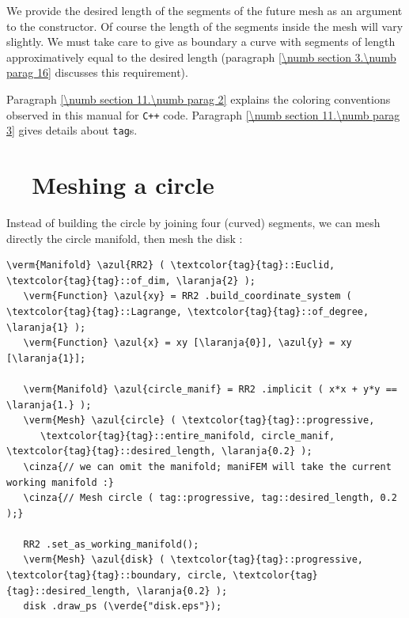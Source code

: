 We provide the desired length of the segments of the future mesh as an argument to the
constructor.
Of course the length of the segments inside the mesh will vary slightly.
We must take care to give as boundary a curve with segments of length approximatively equal
to the desired length (paragraph \ref{\numb section 3.\numb parag 16} discusses
this requirement).

Paragraph \ref{\numb section 11.\numb parag 2} explains the coloring conventions observed
in this manual for {\tt C++} code.
Paragraph \ref{\numb section 11.\numb parag 3} gives details about {\small\tt \textcolor{tag}{tag}}s.


\section{~~Meshing a circle}\label{\numb section 3.\numb parag 2}

Instead of building the circle by joining four (curved) segments, we can mesh directly
the circle manifold, then mesh the disk :

\begin{Verbatim}[commandchars=\\\{\},formatcom=\small\tt,frame=single,
   label=parag-\ref{\numb section 3.\numb parag 2}.cpp,rulecolor=\color{coment},
   baselinestretch=0.94,framesep=2mm                                            ]
   \verm{Manifold} \azul{RR2} ( \textcolor{tag}{tag}::Euclid, \textcolor{tag}{tag}::of_dim, \laranja{2} );
   \verm{Function} \azul{xy} = RR2 .build_coordinate_system ( \textcolor{tag}{tag}::Lagrange, \textcolor{tag}{tag}::of_degree, \laranja{1} );
   \verm{Function} \azul{x} = xy [\laranja{0}], \azul{y} = xy [\laranja{1}];
   
   \verm{Manifold} \azul{circle_manif} = RR2 .implicit ( x*x + y*y == \laranja{1.} );
   \verm{Mesh} \azul{circle} ( \textcolor{tag}{tag}::progressive,
      \textcolor{tag}{tag}::entire_manifold, circle_manif, \textcolor{tag}{tag}::desired_length, \laranja{0.2} );
   \cinza{// we can omit the manifold; maniFEM will take the current working manifold :}
   \cinza{// Mesh circle ( tag::progressive, tag::desired_length, 0.2 );}
   
   RR2 .set_as_working_manifold();
   \verm{Mesh} \azul{disk} ( \textcolor{tag}{tag}::progressive, \textcolor{tag}{tag}::boundary, circle, \textcolor{tag}{tag}::desired_length, \laranja{0.2} );
   disk .draw_ps (\verde{"disk.eps"});
\end{Verbatim}

